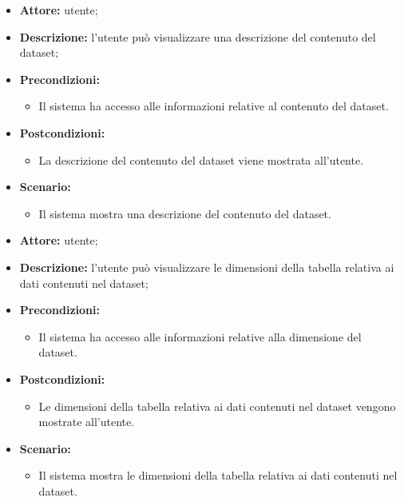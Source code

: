     \begin{itemize}
        \item \textbf{Attore:} utente;
        \item \textbf{Descrizione:} l'utente può visualizzare una descrizione del contenuto del dataset;
        \item \textbf{Precondizioni:}
        \begin{itemize}
            \item Il sistema ha accesso alle informazioni relative al contenuto del dataset.
        \end{itemize}
        \item \textbf{Postcondizioni:}
        \begin{itemize}
            \item La descrizione del contenuto del dataset viene mostrata all'utente.
        \end{itemize}
        \item \textbf{Scenario:}
        \begin{itemize}
            \item Il sistema mostra una descrizione del contenuto del dataset.
        \end{itemize}
    \end{itemize}

    \begin{itemize}
        \item \textbf{Attore:} utente;
        \item \textbf{Descrizione:} l'utente può visualizzare le dimensioni della tabella relativa ai dati contenuti nel dataset;
        \item \textbf{Precondizioni:}
        \begin{itemize}
            \item Il sistema ha accesso alle informazioni relative alla dimensione del dataset.
        \end{itemize}
        \item \textbf{Postcondizioni:}
        \begin{itemize}
            \item Le dimensioni della tabella relativa ai dati contenuti nel dataset vengono mostrate all'utente.
        \end{itemize}
        \item \textbf{Scenario:}
        \begin{itemize}
            \item Il sistema mostra le dimensioni della tabella relativa ai dati contenuti nel dataset.
        \end{itemize}
    \end{itemize}

